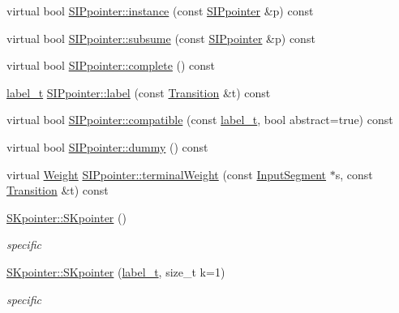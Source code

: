 \begin{DoxyCompactItemize}
virtual bool \mbox{\hyperlink{group__table_gad7e14d03ea63991d16a0da5292eda82d}{S\+I\+Ppointer\+::instance}} (const \mbox{\hyperlink{classSIPpointer}{S\+I\+Ppointer}} \&p) const
\item 
virtual bool \mbox{\hyperlink{group__table_gae02f880deb0305e3122caf05f9d2bad0}{S\+I\+Ppointer\+::subsume}} (const \mbox{\hyperlink{classSIPpointer}{S\+I\+Ppointer}} \&p) const
\item 
virtual bool \mbox{\hyperlink{group__table_ga2f95b5a2058b20744a00737b1240bc83}{S\+I\+Ppointer\+::complete}} () const
\item 
\mbox{\hyperlink{group__output_ga22fde970e635fcf63962743b2d5c441d}{label\+\_\+t}} \mbox{\hyperlink{group__table_ga7f7cd8ae86d71b147fc662d3cc4977c0}{S\+I\+Ppointer\+::label}} (const \mbox{\hyperlink{classTransition}{Transition}} \&t) const
\item 
virtual bool \mbox{\hyperlink{group__table_gabf87df773f8e0f628e0bae79e88097db}{S\+I\+Ppointer\+::compatible}} (const \mbox{\hyperlink{group__output_ga22fde970e635fcf63962743b2d5c441d}{label\+\_\+t}}, bool abstract=true) const
\item 
virtual bool \mbox{\hyperlink{group__table_gaf830b0bf9d24b53e4674de49308b7853}{S\+I\+Ppointer\+::dummy}} () const
\item 
virtual \mbox{\hyperlink{classWeight}{Weight}} \mbox{\hyperlink{group__table_ga01caac75d66ff2e272a248c7e1954415}{S\+I\+Ppointer\+::terminal\+Weight}} (const \mbox{\hyperlink{classInputSegment}{Input\+Segment}} $\ast$s, const \mbox{\hyperlink{classTransition}{Transition}} \&t) const
\item 
\mbox{\label{group__table_gaffcc41d2b1b8a85e3ea9acd3086321f5}} 
\mbox{\hyperlink{group__table_gaffcc41d2b1b8a85e3ea9acd3086321f5}{S\+Kpointer\+::\+S\+Kpointer}} ()
\begin{DoxyCompactList}\small\item\em specific \end{DoxyCompactList}\item 
\mbox{\label{group__table_ga876c1101716f9aea625574f9be9b3da5}} 
\mbox{\hyperlink{group__table_ga876c1101716f9aea625574f9be9b3da5}{S\+Kpointer\+::\+S\+Kpointer}} (\mbox{\hyperlink{group__output_ga22fde970e635fcf63962743b2d5c441d}{label\+\_\+t}}, size\+\_\+t k=1)
\begin{DoxyCompactList}\small\item\em specific \end{DoxyCompactList}\item 

\end{DoxyCompactItemize}
